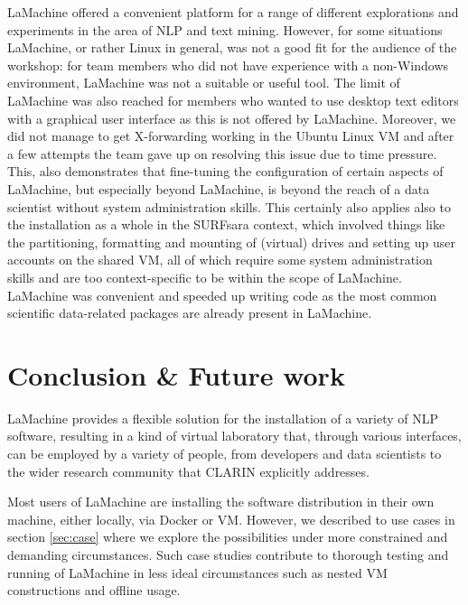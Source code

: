 \documentclass[a4paper,11pt]{article}
\begin{document}
LaMachine offered a convenient platform for a range of different explorations and experiments in the area of NLP and
text mining. However, for some situations LaMachine, or rather Linux in general, was not a good fit for the audience of
the workshop: for team members who did not have experience with a non-Windows environment, LaMachine was not a suitable
or useful tool. The limit of LaMachine was also reached for members who wanted to use desktop text editors with a
graphical user interface as this is not offered by LaMachine. Moreover, we did not manage to get X-forwarding working in the
Ubuntu Linux VM and after a few attempts the team gave up on resolving this issue due to time pressure. This, also
demonstrates that fine-tuning the configuration of certain aspects of LaMachine, but especially beyond LaMachine, is beyond the reach of a data scientist
without system administration skills. This certainly also applies also to the installation as a whole in the
SURFsara context, which involved things like the partitioning, formatting and mounting of (virtual) drives and setting
up user accounts on the shared VM, all of which require some system administration skills and are too context-specific
to be within the scope of LaMachine.
LaMachine was convenient and speeded up writing code as the most common scientific data-related packages are already present in LaMachine.

\section{Conclusion \& Future work}

LaMachine provides a flexible solution for the installation of a variety of NLP software, resulting in a kind
of virtual laboratory that, through various interfaces, can be employed by a variety of people, from developers and data scientists to the wider research community that CLARIN explicitly addresses.

Most users of LaMachine are installing the software distribution in their own machine, either locally, via Docker or VM. However, we described to use cases in section \ref{sec:case} where we explore the possibilities under more constrained and demanding circumstances.
Such case studies contribute to thorough testing and running of LaMachine in less ideal circumstances such as nested VM constructions and offline usage.
\end{document}
